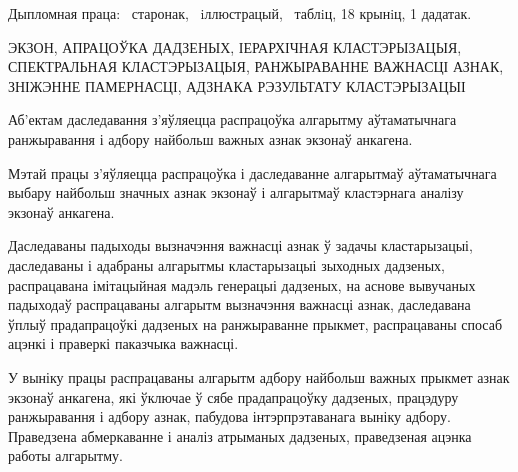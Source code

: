 Дыпломная праца: \ старонак, \totalfigures{}~iллюстрацый, \totaltables{}~таблiц,
18 крынiц, 1 дадатак.


\vspace{\baselineskip} 
ЭКЗОН, АПРАЦОЎКА ДАДЗЕНЫХ, ІЕРАРХІЧНАЯ КЛАСТЭРЫЗАЦЫЯ, СПЕКТРАЛЬНАЯ КЛАСТЭРЫЗАЦЫЯ, РАНЖЫРАВАННЕ ВАЖНАСЦІ АЗНАК, ЗНІЖЭННЕ ПАМЕРНАСЦІ, АДЗНАКА РЭЗУЛЬТАТУ КЛАСТЭРЫЗАЦЫІ

\vspace{\baselineskip}

Аб'ектам даследавання з'яўляецца распрацоўка алгарытму аўтаматычнага ранжыравання і адбору найбольш важных азнак экзонаў анкагена.

Мэтай працы з'яўляецца распрацоўка і даследаванне алгарытмаў аўтаматычнага выбару найбольш значных азнак экзонаў і алгарытмаў кластэрнага аналізу экзонаў анкагена.

Даследаваны падыходы вызначэння важнасці азнак ў задачы кластарызацыі, даследаваны і адабраны алгарытмы кластарызацыі зыходных дадзеных, распрацавана імітацыйная мадэль генерацыі дадзеных, на аснове вывучаных падыходаў распрацаваны алгарытм вызначэння важнасці азнак, даследавана ўплыў прадапрацоўкі дадзеных на ранжыраванне прыкмет, распрацаваны спосаб ацэнкі і праверкі паказчыка важнасці.

У выніку працы распрацаваны алгарытм адбору найбольш важных прыкмет азнак экзонаў анкагена, які ўключае ў сябе прадапрацоўку дадзеных, працэдуру ранжыравання і адбору азнак, пабудова інтэрпрэтаванага выніку адбору. Праведзена абмеркаванне і аналіз атрыманых дадзеных, праведзеная ацэнка работы алгарытму.
